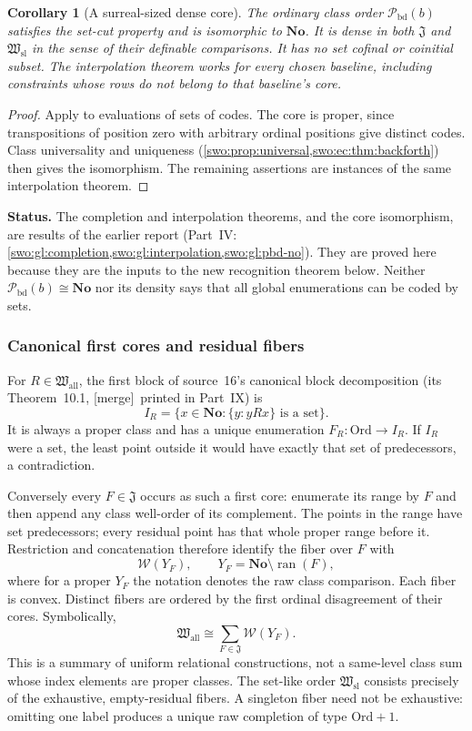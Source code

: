 \documentclass[11pt]{article}
\newtheorem{corollary}[corollary]{Corollary}
\theoremstyle{definition}
\theoremstyle{remark}
\newcommand{\No}{\mathbf{No}}
\newcommand{\Ord}{\mathrm{Ord}}
\newcommand{\WO}{\mathcal W}
\newcommand{\Hsl}{\mathfrak W_{\mathrm{sl}}}
\newcommand{\Hall}{\mathfrak W_{\mathrm{all}}}
\newcommand{\Jinj}{\mathfrak J}
\newcommand{\Pbd}{\mathcal P_{\mathrm{bd}}}
\newcommand{\ran}{\operatorname{ran}}
\newcommand{\merge}{\textsf{[merge]}}
\begin{document}
\begin{corollary}[A surreal-sized dense core]\label{swo:ds:cor:coreiso}
The ordinary class order $\Pbd(b)$ satisfies the set-cut property and is
isomorphic to $\No$. It is dense in both $\Jinj$ and $\Hsl$ in the sense of
their definable comparisons. It has no set cofinal or coinitial subset.
The interpolation theorem works for every chosen baseline, including
constraints whose rows do not belong to that baseline's core.
\end{corollary}
\begin{proof}
Apply  to evaluations of sets of codes.
The core is proper, since transpositions of position zero with arbitrary
ordinal positions give distinct codes. Class universality and uniqueness (\cref{swo:prop:universal,swo:ec:thm:backforth})
then gives the isomorphism. The remaining assertions are instances of
the same interpolation theorem.
\end{proof}

\par\smallskip\noindent\textbf{Status.} The completion and interpolation theorems, and the core
isomorphism, are results of the earlier report (Part~IV:
\cref{swo:gl:completion,swo:gl:interpolation,swo:gl:pbd-no}). They
are proved here because they are the inputs to the new recognition theorem
below. Neither $\Pbd(b)\cong\No$ nor its density says that all global
enumerations can be coded by sets.\par\smallskip

\subsubsection{Canonical first cores and residual fibers}

For $R\in \Hall$, the first block of source~16's canonical block decomposition
(its Theorem~10.1, \merge\ printed in Part~IX) is
\[
 I_R=\{x\in\No:\{y:yRx\}\text{ is a set}\}.
\]
It is always a proper class and has a unique enumeration
$F_R:\Ord\to I_R$. If $I_R$ were a set, the least point outside it
would have exactly that set of predecessors, a contradiction.

Conversely every $F\in \Jinj$ occurs as such a first core: enumerate its
range by $F$ and then append any class well-order of its complement.
The points in the range have set predecessors; every residual point
has that whole proper range before it. Restriction and concatenation
therefore identify the fiber over $F$ with
\[
 \WO(Y_F),\qquad Y_F=\No\setminus\ran(F),
\tag{S16.12}\label{swo:ds:eq:fiber}
\]
where for a proper $Y_F$ the notation denotes the raw class comparison.
Each fiber is convex. Distinct fibers are ordered by the first ordinal
disagreement of their cores. Symbolically,
\[
 \Hall\cong\sum_{F\in \Jinj}\WO(Y_F).
\tag{S16.13}\label{swo:ds:eq:rawsum}
\]
This is a summary of uniform relational constructions, not a same-level
class sum whose index elements are proper classes. The set-like order
$\Hsl$ consists precisely of the exhaustive, empty-residual fibers.
A singleton fiber need not be exhaustive: omitting one label produces
a unique raw completion of type $\Ord+1$.
\end{document}
